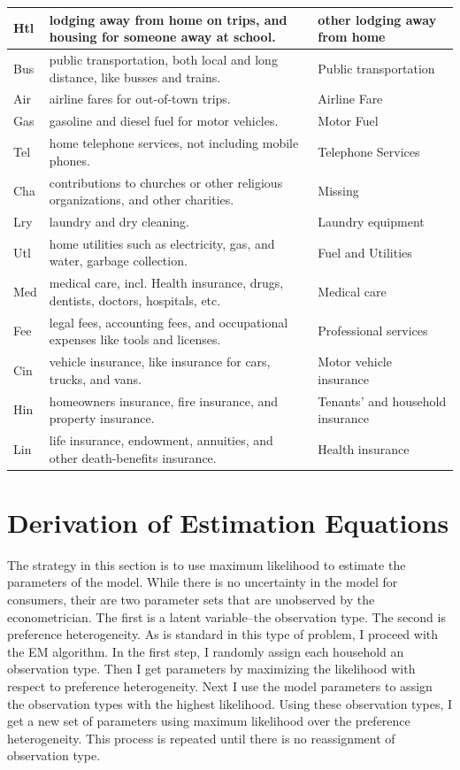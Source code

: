 \documentclass{article}
\begin{document}
\begin{sideways}
\begin{tabular}{|l|l|l|}
\hline
Htl & lodging away from home on trips, and housing for someone away at school. & other lodging away from home\\ 
\hline
Bus & public transportation, both local and long distance, like busses and trains. & Public transportation\\ 
\hline
Air & airline fares for out-of-town trips. & Airline Fare\\ 
\hline
Gas & gasoline and diesel fuel for motor vehicles. & Motor Fuel\\ 
\hline
Tel & home telephone services, not including mobile phones. & Telephone Services\\ 
\hline
Cha & contributions to churches or other religious organizations, and other charities. & Missing\\ 
\hline
Lry & laundry and dry cleaning. & Laundry equipment\\ 
\hline
Utl & home utilities such as electricity, gas, and water, garbage collection. & Fuel and Utilities\\ 
\hline
Med & medical care, incl. Health insurance, drugs, dentists, doctors, hospitals, etc. & Medical care\\ 
\hline
Fee & legal fees, accounting fees, and occupational expenses like tools and licenses. & Professional services\\ 
\hline
Cin & vehicle insurance, like insurance for cars, trucks, and vans. & Motor vehicle insurance\\ 
\hline
Hin & homeowners insurance, fire insurance, and property insurance. & Tenants' and household insurance\\ 
\hline
Lin & life insurance, endowment, annuities, and other death-benefits insurance. & Health insurance\\ 
\hline
\end{tabular}
\end{sideways}

\section{Derivation of Estimation Equations}
The strategy in this section is to use maximum likelihood to estimate the parameters of the model.  
While there is no uncertainty in the model for consumers, their are two parameter sets that are unobserved by the econometrician.
The first is a latent variable--the observation type.
The second is preference heterogeneity.
As is standard in this type of problem, I proceed with the EM algorithm.
In the first step, I randomly assign each household an observation type.
Then I get parameters by maximizing the likelihood with respect to preference heterogeneity.
Next I use the model parameters to assign the observation types with the highest likelihood.
Using these observation types, I get a new set of parameters using maximum likelihood over the preference heterogeneity.
This process is repeated until there is no reassignment of observation type.
\end{document}
